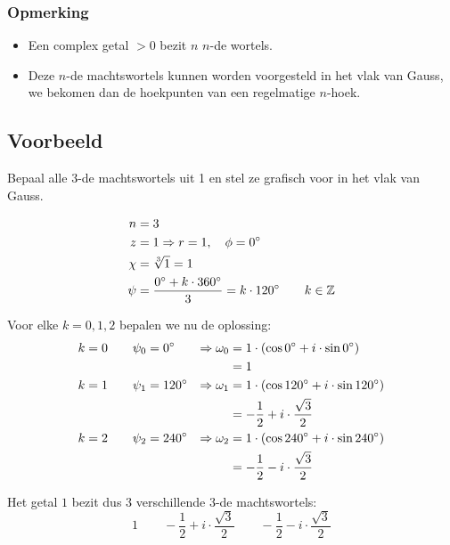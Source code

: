 \documentclass[12pt,twoside,a4paper]{article}
\begin{document}
\subsubsection*{Opmerking}
\begin{itemize}
\item Een complex getal $>0$ bezit $n$ $n$-de wortels.
\item Deze $n$-de machtswortels kunnen worden voorgesteld in het vlak van Gauss, we bekomen dan de hoekpunten van een regelmatige $n$-hoek.
\end{itemize}

\subsection{Voorbeeld}

Bepaal alle $3$-de machtswortels uit 1 en stel ze grafisch voor in het vlak van Gauss.

\begin{align*}
  n &= 3\\
  z &= 1 \Rightarrow r = 1, \quad \phi = 0^\circ\\
  \chi &= \sqrt[3]{1} = 1\\
  \psi &= \dfrac{0^\circ + k \cdot 360^\circ}{3} = k \cdot 120^\circ \qquad k\in\mathbb{Z}
\end{align*}

Voor elke $k=0, 1, 2$ bepalen we nu de oplossing:
\begin{align*}
  k=0 \qquad \psi_0 &= 0^\circ   &\Rightarrow \omega_0 &= 1 \cdot (\cos 0^\circ + i \cdot \sin 0^\circ)\\
            &             &       &= 1\\
  k=1 \qquad \psi_1 &= 120^\circ &\Rightarrow \omega_1 &= 1 \cdot (\cos 120^\circ + i \cdot \sin 120^\circ)\\
            &             &       &= -\dfrac{1}{2} + i \cdot \dfrac{\sqrt{3}}{2}\\
  k=2 \qquad \psi_2 &= 240^\circ &\Rightarrow \omega_2 &= 1 \cdot (\cos 240^\circ + i \cdot \sin 240^\circ)\\
            &             &       &= -\dfrac{1}{2} - i \cdot \dfrac{\sqrt{3}}{2}\\
\end{align*}

Het getal $1$ bezit dus $3$ verschillende $3$-de machtswortels:
\[1 \qquad -\dfrac{1}{2} + i \cdot \dfrac{\sqrt{3}}{2} \qquad -\dfrac{1}{2} - i \cdot \dfrac{\sqrt{3}}{2}\]
\end{document}
